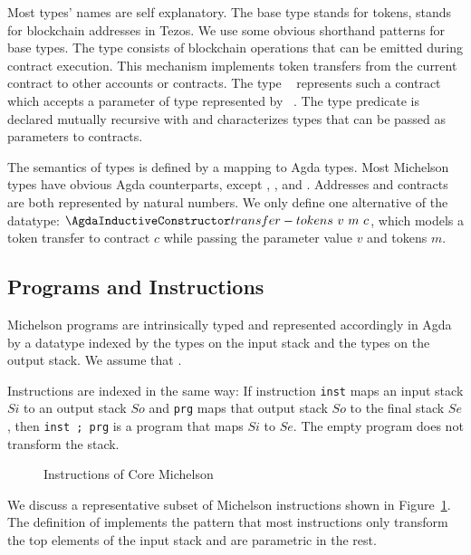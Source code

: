 Most types' names are self explanatory. The base type {\Amutez} stands
for tokens, {\Aaddr} stands for blockchain addresses in  Tezos. We use
some obvious shorthand patterns for base types.
The type {\Aoperation} consists of blockchain operations that can
be emitted during contract execution. This mechanism implements token
transfers from the current contract to other accounts or contracts.
The type {\Acontract~\AP} represents such a contract
which accepts a parameter of type {\Aty} represented by {\APassable~\Aty}.
The type predicate {\TypesPassable} is declared mutually recursive with {\AType}
and characterizes types that can be passed as parameters to contracts.

The semantics of types is defined by a mapping to Agda types. Most
Michelson types have  obvious Agda counterparts, except {\Aaddr},
{\Acontract}, and {\Aoperation}.  Addresses and contracts are both
represented by natural numbers. We only define one alternative of the
{\AOperation} datatype: {$\AtransferTokens~v~m~c$}, which models a
token transfer to contract $c$ while passing the parameter value $v$
and tokens $m$.

\subsection{Programs and Instructions}
\label{sec:michelson-programs}


Michelson programs are intrinsically typed and represented accordingly in
Agda by a datatype {\AProgram} indexed by the types on the input stack
and the types on the output stack. We assume that \TypesStack.
\SyntaxProgram

Instructions are indexed in the same way:
If  instruction \verb/inst/ maps an input stack $Si$ to an output stack $So$
and \verb/prg/ maps that output stack $So$ to the final stack $Se$,
then \verb/inst ; prg/ is a program that maps $Si$ to $Se$.
The empty program {\Aend} does not transform the stack.

\begin{figure}[tp]
  \SyntaxInstruction  
  \caption{Instructions of Core Michelson}
  \label{fig:core-michelson-instructions}
\end{figure}
We discuss a representative subset of Michelson instructions shown in Figure~\ref{fig:core-michelson-instructions}.
The definition of {\AInstructionPlus} implements the pattern that most
instructions only transform the top elements of the input stack and are parametric in the rest. 

